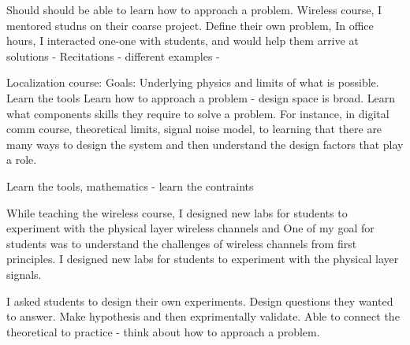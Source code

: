 \documentclass[10pt]{article}
\begin{document}
Should should be able to learn how to approach a problem. 
Wireless course, I mentored studns on their coarse project. Define their own problem,
In office hours, I interacted one-one with students, and would help them arrive at solutions - 
Recitations - different examples - 

Localization course:
Goals: Underlying physics and limits of what is possible. 
Learn the tools 
Learn how to approach a problem - design space is broad.
Learn what components skills they require to solve a problem. 
For instance, in digital comm course, theoretical limits, signal noise model, to learning that there are many ways to design the system and then understand the design factors that play a role.


Learn the tools, mathematics - learn the contraints


While teaching the wireless course, I designed new labs for students to experiment with the physical layer wireless channels and One of my goal for students was to understand the challenges of wireless channels from first principles. I designed new labs for students to experiment with the physical layer signals. 

I asked students to design their own experiments. Design questions they wanted to answer. Make hypothesis and then exprimentally validate. Able to connect the theoretical to practice - think about how to approach a problem.





\end{document}

